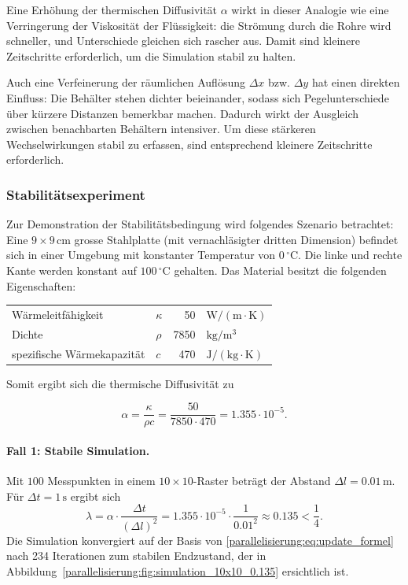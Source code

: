 Eine Erhöhung der thermischen Diffusivität \(\alpha\) wirkt in dieser Analogie wie eine Verringerung der Viskosität der Flüssigkeit: die Strömung durch die Rohre wird schneller, und Unterschiede gleichen sich rascher aus.
%
%
Damit sind kleinere Zeitschritte erforderlich, um die Simulation stabil zu halten.

Auch eine Verfeinerung der räumlichen Auflösung \(\Delta x \) bzw. \(\Delta y\) hat einen direkten Einfluss: Die Behälter stehen dichter beieinander, sodass sich Pegelunterschiede über kürzere Distanzen bemerkbar machen. Dadurch wirkt der Ausgleich zwischen benachbarten Behältern intensiver. Um diese stärkeren Wechselwirkungen stabil zu erfassen, sind entsprechend kleinere Zeitschritte erforderlich.

\subsubsection{Stabilitätsexperiment}

Zur Demonstration der Stabilitätsbedingung wird folgendes Szenario betrachtet:
Eine \(9 \times 9 \, \mathrm{cm}\) grosse Stahlplatte (mit vernachläsigter dritten Dimension) befindet sich in einer Umgebung mit konstanter Temperatur von \(0\,^{\circ}\mathrm{C}\).  
Die linke und rechte Kante werden konstant auf \(100\,^{\circ}\mathrm{C}\) gehalten.  
Das Material besitzt die folgenden Eigenschaften:
\begin{center}
	\begin{tabular}{llrl}
		Wärmeleitfähigkeit & \(\kappa\) & 50 &
		\(\mathrm{W/(m \cdot K)}\) \\
		Dichte & \(\rho\)   &  7850 & \(\mathrm{kg/m^3}\) \\
		spezifische Wärmekapazität & \(c\) &  470 & \(\mathrm{J/(kg \cdot K)}\)
	\end{tabular}
\end{center}
Somit ergibt sich die thermische Diffusivität zu


\[
\alpha =
\frac{\kappa}{\rho c}
=
\frac{50}{7850 \cdot 470}
= 1.355 \cdot 10^{-5}.
\]

\paragraph{Fall 1: Stabile Simulation.}
Mit \(100\) Messpunkten in einem \(10\times 10\)-Raster beträgt der Abstand \(\Delta l = 0.01\,\mathrm{m}\).  
Für \(\Delta t = 1\,\mathrm{s}\) ergibt sich
\[
\lambda =
\alpha \cdot \frac{\Delta t}{(\Delta l)^2}
=
1.355\cdot 10^{-5} \cdot \frac{1}{0.01^2}
\approx 0.135 < \frac14.
\]
Die Simulation konvergiert auf der Basis von \eqref{parallelisierung:eq:update_formel} nach 234 Iterationen zum stabilen Endzustand, der in  Abbildung~\ref{parallelisierung:fig:simulation_10x10_0.135} ersichtlich ist.

